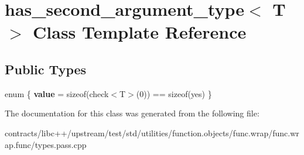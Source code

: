 \hypertarget{classhas__second__argument__type}{}\section{has\+\_\+second\+\_\+argument\+\_\+type$<$ T $>$ Class Template Reference}
\label{classhas__second__argument__type}
\subsection*{Public Types}
\begin{DoxyCompactItemize}
\item 
\mbox{\label{classhas__second__argument__type_ab1d2981b6cfee813408d9cb0d7204a1b}} 
enum \{ {\bfseries value} = sizeof(check$<$T$>$(0)) == sizeof(yes)
 \}
\end{DoxyCompactItemize}


The documentation for this class was generated from the following file\+:\begin{DoxyCompactItemize}
\item 
contracts/libc++/upstream/test/std/utilities/function.\+objects/func.\+wrap/func.\+wrap.\+func/types.\+pass.\+cpp\end{DoxyCompactItemize}
